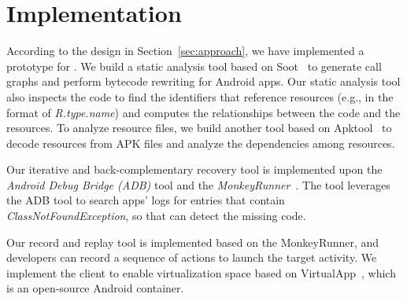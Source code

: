 \section{Implementation}



According to the design in Section~\ref{sec:approach}, we have implemented a prototype for \nickName{}.
We build a static analysis tool based on Soot~\cite{soot} to generate call graphs and perform bytecode rewriting for Android apps.  
Our static analysis tool also inspects the code to find the identifiers that reference resources (e.g., in the format of \textit{R.type.name}) and computes the relationships between the code and the resources.
To analyze resource files, we build another tool based on Apktool~\cite{apktool} to decode resources from APK files and analyze the dependencies among resources. 
 
Our iterative and back-complementary recovery tool is implemented upon the \textit{Android Debug Bridge (ADB)} tool and the \textit{MonkeyRunner}~\cite{monkeyrunner}.
The tool leverages the ADB tool to search apps' logs for entries that contain \textit{ClassNotFoundException}, so that \nickName can detect the missing code. 

Our record and replay tool is implemented based on the MonkeyRunner, and developers can record a sequence of actions to launch the target activity. 
We implement the \nickName{} client to enable virtualization space based on VirtualApp~\cite{virtualapp}, which is an open-source Android container.